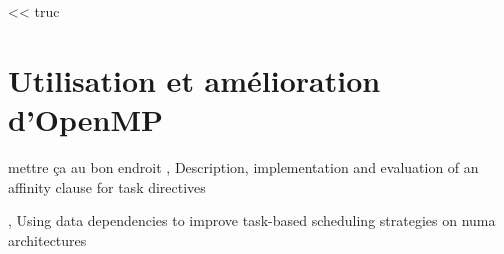 
\begin{savequote}[6cm]
<< truc
\end{savequote}

\chapter{Utilisation et amélioration d'OpenMP}\label{chap:contrib:openmp}
\chaptertoc


%



\begin{todo}
  mettre ça au bon endroit
\cite{Virouleau2016}, Description, implementation and evaluation of an affinity clause for task directives

\cite{Virouleau2016b}, Using data dependencies to improve task-based scheduling strategies on numa architectures
\end{todo}







